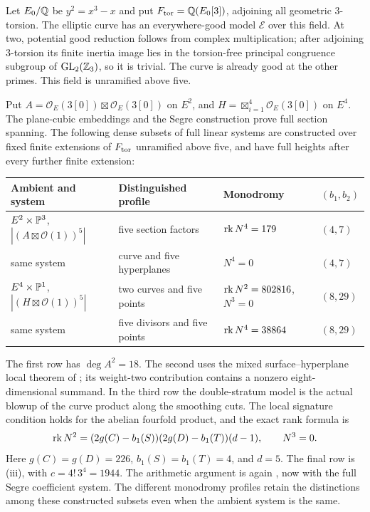 Let $E_0/\mathbb Q$ be $y^2=x^3-x$ and put
$F_{\rm tor}=\mathbb Q(E_0[3])$, adjoining all geometric $3$-torsion.
The elliptic curve has an everywhere-good model $\mathcal E$
over this field. At two, potential good reduction follows from
complex multiplication; after adjoining $3$-torsion its finite
inertia image lies in the torsion-free principal congruence
subgroup of $\operatorname{GL}_2(\mathbb Z_3)$, so it is trivial. The
curve is already good at the other primes. This field is
unramified above five.

Put $A=\mathcal O_E(3[0])\boxtimes\mathcal O_E(3[0])$ on $E^2$,
and $H=\boxtimes_{i=1}^4\mathcal O_E(3[0])$ on $E^4$.
The plane-cubic embeddings and the Segre construction prove full
section spanning. The following dense subsets of full linear
systems are constructed over fixed finite extensions of
$F_{\rm tor}$ unramified above five, and have full heights after
every further finite extension:
\begin{center}
\begin{tabular}{llll}
\toprule
Ambient and system & Distinguished profile & Monodromy & $(b_1,b_2)$\\
\midrule
$E^2\times\mathbb P^3$, $|(A\boxtimes\mathcal O(1))^5|$
 & five section factors & $\operatorname{rk} N^4=179$ & $(4,7)$\\
same system & curve and five hyperplanes & $N^4=0$ & $(4,7)$\\
$E^4\times\mathbb P^1$, $|(H\boxtimes\mathcal O(1))^5|$
 & two curves and five points & $\operatorname{rk} N^2=802816$, $N^3=0$ & $(8,29)$\\
same system & five divisors and five points & $\operatorname{rk} N^4=38864$ & $(8,29)$\\
\bottomrule
\end{tabular}
\end{center}
The first row has $\deg A^2=18$. The second uses the mixed
surface--hyperplane local theorem of \cite{InternalMixedFamilies};
its weight-two contribution contains a nonzero eight-dimensional
summand. In the third row the double-stratum model is the actual
blowup of the curve product along the smoothing cuts. The local
signature condition holds for the abelian fourfold product, and
the exact rank formula is
\[
 \operatorname{rk} N^2=(2g(C)-b_1(S))(2g(D)-b_1(T))(d-1),\qquad N^3=0.
\]
Here $g(C)=g(D)=226$, $b_1(S)=b_1(T)=4$, and $d=5$.
The final row is (iii), with
$c=4!\,3^4=1944$. The arithmetic argument is again
, now with the full Segre coefficient
system. The different monodromy profiles retain the distinctions
among these constructed subsets even when the ambient system is
the same.
